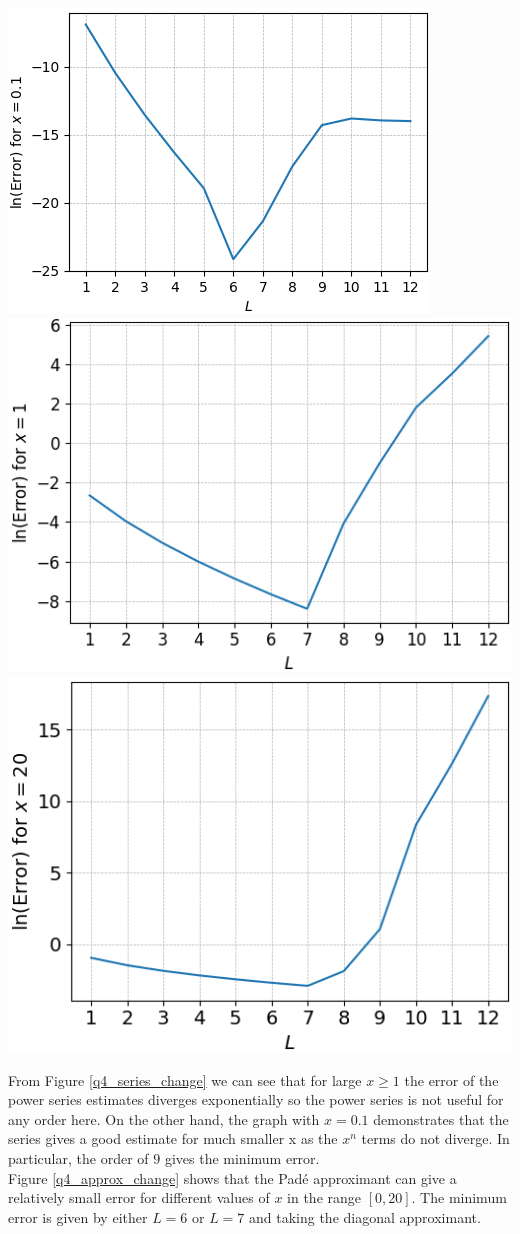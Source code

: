 \documentclass[12pt, a4paper]{article}
\begin{document}
\begin{minipage}{\textwidth}
	\centering
	\includegraphics[width=0.49\linewidth]{q4_approx_x=0.1}
	\includegraphics[width=0.49\linewidth]{q4_approx_x=1}
	\includegraphics[width=0.5\linewidth]{q4_approx_x=20}
	\label{q4_approx_change}
\end{minipage}
\vspace{0.5cm}

From Figure \ref{q4_series_change} we can see that for large $x \geq 1$ the error of the power series
estimates diverges exponentially so the power series is not useful for any order here. On the other
hand, the graph with $x = 0.1$ demonstrates that the series gives a good estimate for much smaller x
as the $x^{n}$ terms do not diverge. In particular, the order of $9$ gives the minimum error.
\\

Figure \ref{q4_approx_change} shows that the Pad\'e approximant can give a relatively small error
for different values of $x$ in the range $[0, 20]$. The minimum error is given by either $L = 6$ or
$L = 7$ and taking the diagonal approximant.
\\
\end{document}
